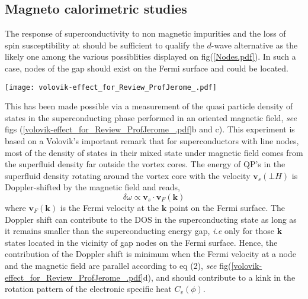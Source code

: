\documentclass[11pt]{article} %
\begin{document}
\subsection{Magneto calorimetric studies}
The  response of superconductivity to non magnetic impurities and the loss of spin susceptibility at \tc should be sufficient to qualify the $d$-wave  alternative as the likely one among the various possiblities displayed on fig(\ref{Nodes.pdf}). In such a case, nodes of the gap should exist  on the Fermi surface and could be located.
\begin{figure*}[h]	
 \centerline{\texttt{[image: volovik-effect\_for\_Review\_ProfJerome\_.pdf]}}
\caption{a-  Fermi suface of \tmc at low temperature in the presence of anion ordering\cite{Lepevelen01}. b- Angular dependence of $C(\phi)$ at 0.14 K and 0.3 T according to reference\cite{Yonezawa12}. c- First and second derivatives of the  data displayed on a. d- Sketch of the influence of a magnetic field on the quasi particle DOS. The contribution of Doppler-shifted quasi-particles  to the DOS is minimum when  the magnetic field is  parallel to $\textbf{v}_F$ at one of the nodes (left or right) . e and f- Simulations of the specific heat in the vicinity of the angle $\phi=0$ using the band structure on fig(\ref{volovik-effect_for_Review_ProfJerome_.pdf}a). Arrows correspond to the different orientations of the magnetic field as shown on fig(\ref{volovik-effect_for_Review_ProfJerome_.pdf}).
} 
\label{volovik-effect_for_Review_ProfJerome_.pdf} 
\end{figure*}
This has been made possible via a  measurement of the quasi particle density of states in the superconducting phase performed in an oriented magnetic field\cite{Yonezawa12}, \textit{see} figs (\ref{volovik-effect_for_Review_ProfJerome_.pdf}b and c). This experiment is based on a   Volovik's important remark\cite{Volovik93} that for superconductors with line nodes, most of the density of states in their mixed state under magnetic field comes from the superfluid density far outside the vortex cores. The energy of QP's in the superfluid density rotating around the vortex core with the velocity $\textbf{v}_s(\bot H)$ is Doppler-shifted by the magnetic field and reads,
 \begin{equation}
\delta\omega\propto \textbf{v}_s\cdot \textbf{v}_F(\textbf{k})
\end{equation}
\label{2}
 where $ \textbf{v}_F(\textbf{k})$ is the Fermi velocity at the $\textbf{k}$ point on the Fermi surface.
 The Doppler shift can contribute to the DOS in the superconducting state as long as  it remains smaller than the superconducting energy gap, \textit{i.e} only for those \textbf{k} states   located in the vicinity of gap nodes on   the Fermi surface. Hence,  the contribution of the Doppler shift is minimum when the Fermi velocity at a node and the magnetic field are parallel according to eq (2), \textit{see}  fig(\ref{volovik-effect_for_Review_ProfJerome_.pdf}d), and   should contribute to a kink in the rotation pattern of the electronic specific heat $C_v(\phi)$.
\end{document}
